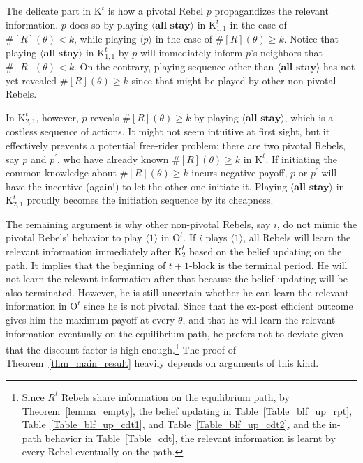 \documentclass[12pt,letter]{article}
\newcommand{\Kappa}{\mathrm{K}}
\newcommand{\Omicron}{\mathrm{O}}
\theoremstyle{definition}
\theoremstyle{remark}
\theoremstyle{claim}
\begin{document}
\clearpage

The delicate part in $\Kappa^t$ is how a pivotal Rebel $p$ propagandizes the relevant information. $p$ does so by playing $\langle \textbf{all stay} \rangle$ in $\Kappa^{t}_{1,1}$ in the case of $\#[R](\theta)< k$, while playing $\langle p \rangle$ in the case of $\#[R](\theta)\geq k$. Notice that playing $\langle \textbf{all stay} \rangle$ in $\Kappa^{t}_{1,1}$ by $p$ will immediately inform $p$'s neighbors that $\#[R](\theta)< k$. On the contrary, playing sequence other than $\langle \textbf{all stay} \rangle$ has not yet revealed $\#[R](\theta)\geq k$ since that might be played by other non-pivotal Rebels. 

In $\Kappa^{t}_{2,1}$, however, $p$ reveals $\#[R](\theta)\geq k$ by playing $\langle \textbf{all stay} \rangle$, which is a costless sequence of actions. It might not seem intuitive at first sight, but it effectively prevents a potential free-rider problem: there are two pivotal Rebels, say $p$ and $p^{'}$, who have already known $\#[R](\theta)\geq k$ in $\Kappa^t$. If initiating the common knowledge about $\#[R](\theta)\geq k$ incurs negative payoff, $p$ or $p^{'}$ will have the incentive (again!) to let the other one initiate it. Playing $\langle \textbf{all stay} \rangle$ in $\Kappa^t_{2,1}$ proudly becomes the initiation sequence by its cheapness.

The remaining argument is why other non-pivotal Rebels, say $i$, do not mimic the pivotal Rebels' behavior to play $\langle 1 \rangle$ in $\Omicron^t$. If $i$ plays $\langle 1 \rangle$, all Rebels will learn the relevant information immediately after $\Kappa^t_2$ based on the belief updating on the path. It implies that the beginning of $t+1$-block is the terminal period. He will not learn the relevant information after that because the belief updating will be also terminated. However, he is still uncertain whether he can learn the relevant information in $\Omicron^t$ since he is not pivotal. Since that the ex-post efficient outcome gives him the maximum payoff at every $\theta$, and that he will learn the relevant information eventually on the equilibrium path, he prefers not to deviate given that the discount factor is high enough.\footnote{Since $R^t$ Rebels share information on the equilibrium path, by Theorem~\ref{lemma_empty}, the belief updating in Table~\ref{Table_blf_up_rpt}, Table~\ref{Table_blf_up_cdt1}, and Table~\ref{Table_blf_up_cdt2}, and the in-path behavior in Table~\ref{Table_cdt}, the relevant information is learnt by every Rebel eventually on the path.} 
The proof of Theorem~\ref{thm_main_result} heavily depends on arguments of this kind.
\end{document}
